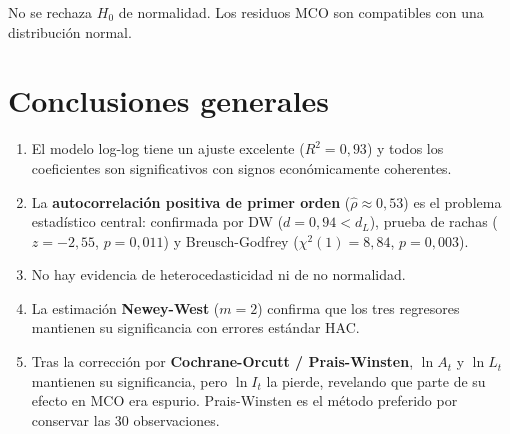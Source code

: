 \documentclass[12pt,a4paper]{article}
\begin{document}
No se rechaza $H_0$ de normalidad. Los residuos MCO son compatibles con
una distribución normal.

\section*{Conclusiones generales}

\begin{enumerate}
  \item El modelo log-log tiene un ajuste excelente ($R^2=0{,}93$) y todos
        los coeficientes son significativos con signos económicamente
        coherentes.

  \item La \textbf{autocorrelación positiva de primer orden} ($\hat\rho\approx0{,}53$)
        es el problema estadístico central: confirmada por DW ($d=0{,}94<d_L$),
        prueba de rachas ($z=-2{,}55$, $p=0{,}011$) y Breusch-Godfrey
        ($\chi^2(1)=8{,}84$, $p=0{,}003$).

  \item No hay evidencia de heterocedasticidad ni de no normalidad.

  \item La estimación \textbf{Newey-West} ($m=2$) confirma que los tres
        regresores mantienen su significancia con errores estándar HAC.

  \item Tras la corrección por \textbf{Cochrane-Orcutt / Prais-Winsten},
        $\ln A_t$ y $\ln L_t$ mantienen su significancia, pero $\ln I_t$
        la pierde, revelando que parte de su efecto en MCO era espurio.
        Prais-Winsten es el método preferido por conservar las 30 observaciones.
\end{enumerate}
\end{document}
